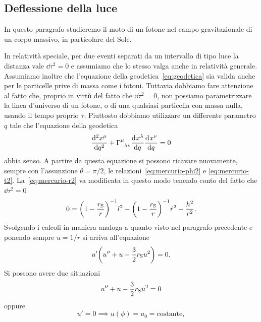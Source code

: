 \subsection{Deflessione della luce}
\label{sec:deflessione-luce}

In questo paragrafo studieremo il moto di un fotone nel campo gravitazionale di
un corpo massivo, in particolare del Sole.

In relatività speciale, per due eventi separati da un intervallo di tipo luce la
distanza vale $\dd\tau^{2} = 0$ e assumiamo che lo stesso valga anche in
relatività generale.  Assumiamo inoltre che l'equazione della
geodetica~\eqref{eq:geodetica} sia valida anche per le particelle prive di massa
come i fotoni.  Tuttavia dobbiamo fare attenzione al fatto che, proprio in virtù
del fatto che $\dd\tau^{2} = 0$, non possiamo parametrizzare la linea d'universo
di un fotone, o di una qualsiasi particella con massa nulla, usando il tempo
proprio $\tau$.  Piuttosto dobbiamo utilizzare un differente parametro $q$ tale
che l'equazione della geodetica
\begin{equation}
  \toder[2]{x^{\mu}}{q} + \tensor{\Gamma}{^{\mu}_{\lambda\nu}}
  \toder{x^{\lambda}}{q} \toder{x^{\nu}}{q} = 0
\end{equation}
abbia senso.  A partire da questa equazione si possono ricavare nuovamente,
sempre con l'assunzione $\theta = \pi/2$, le relazioni~\eqref{eq:mercurio-phi2}
e \eqref{eq:mercurio-t2}.  La~\eqref{eq:mercurio-r2} va modificata in questo
modo tenendo conto del fatto che $\dd\tau^{2} = 0$
\begin{equation}
  0 = \bigg(1 - \frac{r_{\textup{S}}}{r}\bigg)^{-1}l^{2} - \bigg(1 -
  \frac{r_{\textup{S}}}{r}\bigg)^{-1}\dot{r}^{2} - \frac{h^{2}}{r^{2}}.
\end{equation}
Svolgendo i calcoli in maniera analoga a quanto visto nel paragrafo precedente e
ponendo sempre $u = 1/r$ si arriva all'equazione
\begin{equation}
  u'\bigg(u'' + u - \frac{3}{2}r_{\textup{S}}u^{2}\bigg) = 0.
\end{equation}
Si possono avere due situazioni
\begin{equation}
  \label{eq:deflessione1}
  u'' + u - \frac{3}{2}r_{\textup{S}}u^{2} = 0
\end{equation}
oppure
\begin{equation}
  u' = 0 \implies u(\phi) = u_{0} = \text{costante},
\end{equation}
